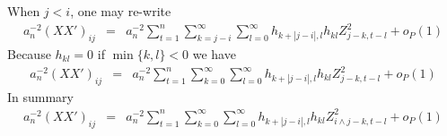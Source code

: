 \documentclass{article}
\begin{document}
When $j < i$, one may re-write
\begin{eqnarray*}
  a_n^{-2}(XX')_{ij} &=& a_n^{-2} \sum_{t=1}^n \sum_{k=j-i}^\infty \sum_{l=0}^\infty
  h_{k+|j-i|,l} h_{kl} Z_{j-k, t-l}^2 + o_P(1)
\end{eqnarray*}
Because $h_{kl} = 0$ if $\min\{k,l\} < 0$ we have
\begin{eqnarray*}
  a_n^{-2}(XX')_{ij} &=& a_n^{-2}\sum_{t=1}^n \sum_{k=0}^\infty \sum_{l=0}^\infty
  h_{k+|j-i|,l} h_{kl} Z_{j-k, t-l}^2 + o_P(1)
\end{eqnarray*}
In summary
\begin{eqnarray*}
  a_n^{-2}(XX')_{ij} &=& a_n^{-2} \sum_{t=1}^n \sum_{k=0}^\infty \sum_{l=0}^\infty
  h_{k+|j-i|,l} h_{kl} Z_{i \wedge j -k, t-l}^2 + o_P(1)
\end{eqnarray*}
\end{document}
